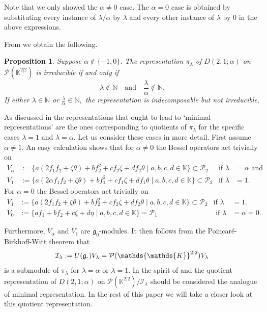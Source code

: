 \documentclass{amsart}
\newtheorem{Prop}[theorem]{Proposition}
\numberwithin{theorem}{section}
\theoremstyle{definition}
\theoremstyle{remark}
\def\K{\mathds{K} }
\newcommand{\ds}[1]{\mathds{#1}}
\newcommand{\mc}[1]{\mathcal{#1}}
\newcommand{\mg}{{\mathfrak{g}}}
\newcommand{\minus}{\scalebox{0.9}{{\rm -}}}
\begin{document}
Note that we only showed the $\alpha\neq 0$ case. The $\alpha=0$ case is obtained by substituting every instance of $\lambda/\alpha$ by $\lambda$ and every other instance of $\lambda$ by $0$ in the above expressions.

From \cite[Proposition 5.3]{BC1} we obtain the following.

\begin{Prop}\label{propsimple}
Suppose $\alpha \not\in \{-1,0\}$. The representation $\pi_\lambda$ of $D(2,1;\alpha)$ on $\mc P(\ds \K^{2|2})$ is irreducible if and only if 
\[\lambda \not\in \ds N \quad\mbox{and}\quad \dfrac{\lambda}{\alpha}\not\in\ds N.\]
If either $\lambda\in \ds N $ or $\frac{\lambda}{\alpha}\in\ds N,$ the representation is indecomposable but not irreducible.
\end{Prop}
As discussed in \cite[Section 5]{BC1} the representations that ought to lead to `minimal representations' are the ones corresponding to quotients of $\pi_\lambda$ for the specific cases $\lambda=1$ and $\lambda=\alpha$. Let us consider these cases in more detail.
First assume $\alpha\neq 1$. An easy calculation shows that for $\alpha \neq 0$ the Bessel operators act trivially on 
\begin{align*}
V_\alpha&:=\{ a(2f_1f_2+\zeta\theta) + b{f_2^2} + c {f_2}\zeta +d {f_2}\theta \mid a,b,c,d \in \mathds{K} \} \subset \mathcal{P}_2 & \text{if } \lambda&=\alpha \text{ and }\\
V_1&:=\{ a (2\alpha f_1f_2+\zeta\theta) + b f_1^2 + c f_1\zeta + d f_1\theta \mid a,b,c,d \in \mathds{K} \} \subset \mathcal{P}_2 & \text{if } \lambda&=1.
\end{align*}
For $\alpha=0$ the Bessel operators act trivially on 
\begin{align*}
V_1 &:=\{ a(2f_1f_2+\zeta\theta) + b{f_2^2} + c {f_2}\zeta +d {f_2}\theta \mid a,b,c,d \in \mathds{K} \} \subset \mathcal{P}_2 & \text{if } \lambda&=1. \\
V_0 &:=\{ a f_1+ b f_2 +c \zeta + d \eta \mid a,b,c,d \in \mathds{K} \} = \mathcal{P}_1
& \text{ if } \lambda &=\alpha=0.  
\end{align*}

Furthermore, $V_\alpha$ and $V_1$ are $\mg_0$-modules.
It then follows from the Poincaré-Birkhoff-Witt theorem that
\begin{align}\label{Eq I lambda}
\mc I_\lambda := U(\mg_{\minus}) V_\lambda=  \mc{P}(\ds \K^{2|2}) V_\lambda
\end{align} is a submodule of $\pi_\lambda$ for $\lambda=\alpha$ or $\lambda=1$.  
In the spirit of \cite{HKMO} and \cite{BC1} the quotient representation of $D(2,1;\alpha)$ on $\mc{P} (\mathds{K}^{2 |2}) / \mc{I}_\lambda$ should be considered the analogue of minimal representation. In the rest of this paper we will take a closer look at this quotient representation.
 
\end{document}
